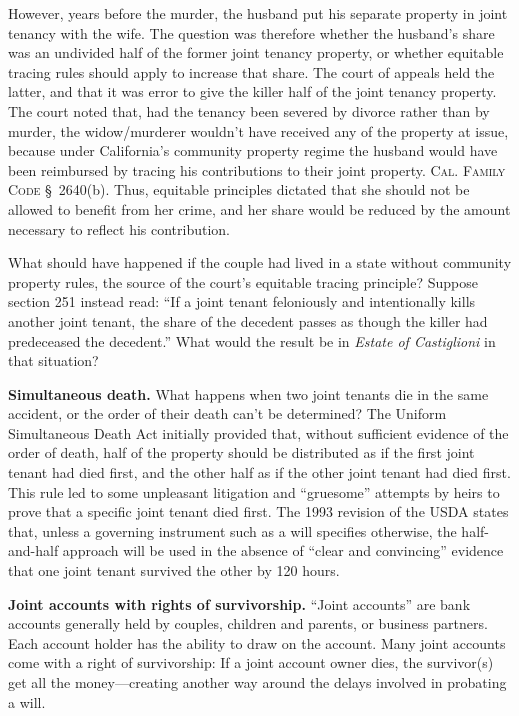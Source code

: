 However, years before the murder, the husband put his separate property in joint
tenancy with the wife. The question was therefore whether the husband's share
was an undivided half of the former joint tenancy property, or whether
equitable tracing rules should apply to increase that share. The court of
appeals held the latter, and that it was error to give the killer half of the
joint tenancy property. The court noted that, had the tenancy been severed by
divorce rather than by murder, the widow/murderer wouldn't have received any of
the property at issue, because under California's community property regime the
husband would have been reimbursed by tracing his contributions to their joint
property. \textsc{Cal. Family Code} \S~2640(b). Thus, equitable principles
dictated that she should not be allowed to benefit from her crime, and her share
would be reduced by the amount necessary to reflect his contribution.



What should have happened if the couple had lived in a state without community
property rules, the source of the court's equitable tracing principle? Suppose
section 251 instead read: ``If a joint tenant feloniously and intentionally
kills another joint tenant, the share of the decedent passes as though the
killer had predeceased the decedent.'' What would the result be in
\textit{Estate of Castiglioni }in that situation?



\item \textbf{Simultaneous death.} What happens when two joint tenants die in
the same accident, or the order of their death can't be determined? The
Uniform Simultaneous Death Act initially provided that, without sufficient
evidence of the order of death, half of the property should be distributed as
if the first joint tenant had died first, and the other half as if the other
joint tenant had died first. This rule led to some unpleasant litigation and
``gruesome'' attempts by heirs to prove that a specific joint tenant died
first. The 1993 revision of the USDA states that, unless a governing
instrument such as a will specifies otherwise, the half-and-half approach will
be used in the absence of ``clear and convincing'' evidence that one joint
tenant survived the other by 120 hours.


\item \textbf{Joint accounts with rights of survivorship.} ``Joint accounts''
are bank accounts generally held by couples, children and parents, or business
partners. Each account holder has the ability to draw on the account. Many
joint accounts come with a right of survivorship: If a joint account owner
dies, the survivor(s) get all the money---creating another way around the
delays involved in probating a will.


